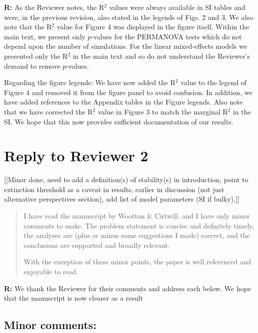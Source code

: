 \documentclass[12pt]{article}
\begin{document}
      \smallskip

      \textbf{R:} As the Reviewer notes, the R$^2$ values were always available in SI tables and were, in the previous revision, also stated in the legends of Figs. 2 and 3. We also note that the R$^2$ value for Figure 4 was displayed in the figure itself. Within the main text, we present only $p$-values for the PERMANOVA tests which do not depend upon the number of simulations. For the linear mixed-effects models we presented only the R$^2$ in the main text and so do not understand the Reviewer's demand to remove $p$-values.


      Regarding the figure legends: We have now added the R$^2$ value to the legend of Figure 4 and removed it from the figure panel to avoid confusion. In addition, we have added references to the Appendix tables in the Figure legends. Also note that we have corrected the R$^2$ value in Figure 3 to match the marginal R$^2$ in the SI. We hope that this now provides sufficient documentation of our results.



\clearpage

\section*{Reply to Reviewer 2} [[Minor done, need to add a definition(s) of stability(s) in introduction, point to extinction threshold as a caveat in results, earlier in discussion (not just alternative perspectives section), add list of model parameters (SI if bulky),]]

  \begin{quotation}
    I have read the manuscript by Wootton \& Cirtwill, and I have only minor comments to make. The problem statement is concise and definitely timely, the analyses are (plus or minus some suggestions I made) correct, and the conclusions are supported and broadly relevant.

    With the exception of these minor points, the paper is well referenced and enjoyable to read.
  \end{quotation}  

  \smallskip

  \textbf{R:} We thank the Reviewer for their comments and address each below. We hope that the manuscript is now clearer as a result

  \smallskip

  \subsection*{Minor comments:}
\end{document}
